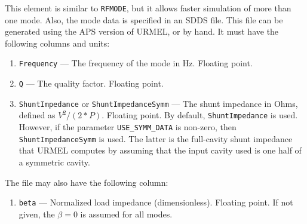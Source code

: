 This element is similar to {\tt RFMODE}, but it allows faster simulation of more than
one mode.  Also, the mode data is specified in an SDDS file.  This file can be
generated using the APS version of URMEL, or by hand. It must have the following
columns and units:
\begin{enumerate}
\item {\tt Frequency} --- The frequency of the mode in Hz.  Floating point.
\item {\tt Q} --- The quality factor.  Floating point.
\item {\tt ShuntImpedance} or {\tt ShuntImpedanceSymm} --- The shunt
  impedance in Ohms, defined as $V^2/(2*P)$.   Floating point. By default, {\tt ShuntImpedance} is
  used.  However, if the parameter \verb|USE_SYMM_DATA| is non-zero, then 
  {\tt ShuntImpedanceSymm}  is used.  The latter is the full-cavity 
  shunt impedance that URMEL computes
  by assuming that the input cavity used is one half of a symmetric cavity.
\end{enumerate}

The file may also have the following column:
\begin{enumerate}
\item {\tt beta} --- Normalized load impedance (dimensionless).   Floating point.  If not given, the
 $\beta=0$ is assumed for all modes.
\end{enumerate}
